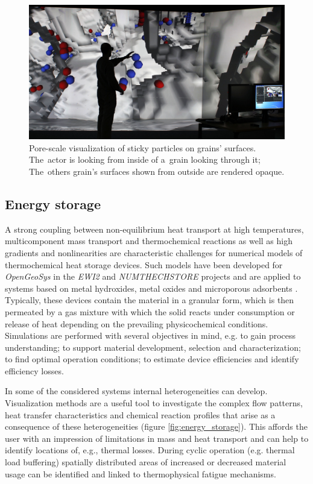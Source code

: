 \documentclass[twocolumn]{svjour3}          %
\begin{document}
\begin{figure}[htb]
  \includegraphics[width=\linewidth]{images/porescale_vislab.jpg}
  \caption{Pore-scale visualization of sticky particles on grains' surfaces.
  The~actor is looking from inside of a~grain looking through it; The~others
  grain's surfaces shown from outside are rendered opaque.}
\label{fig:porescale}
\end{figure}


\subsection{Energy storage}
\label{energy-storage}

A strong coupling between non-equilibrium heat transport at high temperatures, multicomponent mass transport and thermochemical reactions as well as high gradients and nonlinearities are characteristic challenges for numerical models of thermochemical heat storage devices. Such models have been developed for \emph{OpenGeoSys} in the \emph{EWI2} and \emph{NUMTHECHSTORE} projects and are applied to systems based on metal hydroxides, metal oxides and microporous adsorbents \cite{Nagel2013, Shao2013}. Typically, these devices contain the material in a granular form, which is then permeated by a gas mixture with which the solid reacts under consumption or release of heat depending on the prevailing physicochemical conditions. Simulations are performed with several objectives in mind, e.g. to gain process understanding; to support material development, selection and characterization; to find optimal operation conditions; to estimate device efficiencies and identify efficiency losses.

In some of the considered systems internal heterogeneities can develop. Visualization methods are a useful tool to investigate the complex flow patterns, heat transfer characteristics and chemical reaction profiles that arise as a consequence of these heterogeneities (figure \ref{fig:energy_storage}). This affords the user with an impression of limitations in mass and heat transport and can help to identify locations of, e.g., thermal losses. During cyclic operation (e.g. thermal load buffering) spatially distributed areas of increased or decreased material usage can be identified and linked to thermophysical fatigue mechanisms.
\end{document}
